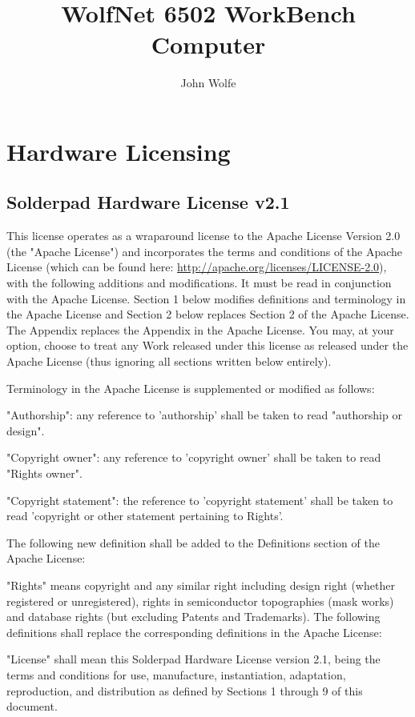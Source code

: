 \documentclass[11pt]{book} %
\title{WolfNet 6502 WorkBench Computer}
\author{John Wolfe}
\date{} %
\begin{document}
\frontmatter
\maketitle
\tableofcontents
\mainmatter
\chapter{Hardware Licensing}
\section{Solderpad Hardware License v2.1}
This license operates as a wraparound license to the Apache License Version 2.0 (the "Apache License") and incorporates the terms and conditions of the Apache License (which can be found here: \url{http://apache.org/licenses/LICENSE-2.0}), with the following additions and modifications. It must be read in conjunction with the Apache License. Section 1 below modifies definitions and terminology in the Apache License and Section 2 below replaces Section 2 of the Apache License. The Appendix replaces the Appendix in the Apache License. You may, at your option, choose to treat any Work released under this license as released under the Apache License (thus ignoring all sections written below entirely).

Terminology in the Apache License is supplemented or modified as follows:

        \textbullet"Authorship": any reference to 'authorship' shall be taken to read "authorship or design".

        \textbullet"Copyright owner": any reference to 'copyright owner' shall be taken to read "Rights owner".

        \textbullet"Copyright statement": the reference to 'copyright statement' shall be taken to read 'copyright or other statement pertaining to Rights'.

The following new definition shall be added to the Definitions section of the Apache License:

        \textbullet"Rights" means copyright and any similar right including design right (whether registered or unregistered), rights in semiconductor topographies (mask works) and database rights (but excluding Patents and Trademarks).
The following definitions shall replace the corresponding definitions in the Apache License:

        \textbullet"License" shall mean this Solderpad Hardware License version 2.1, being the terms and conditions for use, manufacture, instantiation, adaptation, reproduction, and distribution as defined by Sections 1 through 9 of this document.
\end{document}
